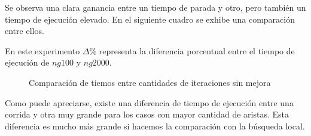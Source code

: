 Se observa una clara ganancia entre un tiempo de parada y otro, pero también
un tiempo de ejecución elevado. En el siguiente cuadro se exhibe una
comparación entre ellos.

En este experimento $\Delta\%$ representa la diferencia porcentual entre el
tiempo de ejecución de $ng 100$ y $ng 2000$.

\begin{figure}[H]
    \centering
    \caption{Comparación de tiemos entre cantidades de iteraciones sin mejora}
    \pgfplotstabletypeset[
        columns={0, localsearchtime, highiterationlowernogainlowaspirationtime, highiterationhighnogainlowaspirationtime, rationogaintime}
    ]{\optimalsolutions}
\end{figure}

Como puede apreciarse, existe una diferencia de tiempo de ejecución entre una
corrida y otra muy grande para los casos con mayor cantidad de aristas.
Esta diferencia es mucho más grande si hacemos la comparación con la búsqueda
local.